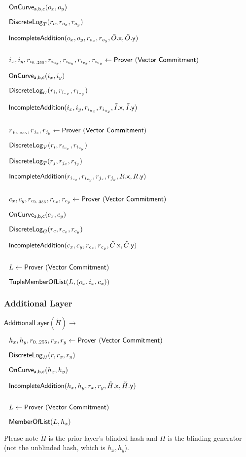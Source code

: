 \documentclass[]{article}
\begin{document}
$~~\mathsf{OnCurve_{a,b,c}}(o_x, o_y)$

$~~\mathsf{DiscreteLog}_T(r_o, r_{o_x}, r_{o_y})$

$~~\mathsf{IncompleteAddition}(o_x, o_y, r_{o_x}, r_{o_y}, \tilde{O}\mathsf{.x}, \tilde{O}\mathsf{.y})$

$ $

$~~i_x, i_y, r_{i_{0..255}}, r_{i_{u_x}}, r_{i_{u_y}}, r_{i_{v_x}}, r_{i_{v_y}}\leftarrow \mathsf{Prover ~(Vector ~Commitment)}$

$~~\mathsf{OnCurve_{a,b,c}}(i_x, i_y)$

$~~\mathsf{DiscreteLog}_U(r_i, r_{i_{u_x}}, r_{i_{u_y}})$

$~~\mathsf{IncompleteAddition}(i_x, i_y, r_{i_{u_x}}, r_{i_{u_y}}, \tilde{I}\mathsf{.x}, \tilde{I}\mathsf{.y})$

$ $

$~~r_{j_{0..255}}, r_{j_x}, r_{j_y}\leftarrow \mathsf{Prover ~(Vector ~Commitment)}$

$~~\mathsf{DiscreteLog}_V(r_i, r_{i_{v_x}}, r_{i_{v_y}})$

$~~\mathsf{DiscreteLog}_T(r_j, r_{j_x}, r_{j_y})$

$~~\mathsf{IncompleteAddition}(r_{i_{v_x}}, r_{i_{v_y}}, r_{j_x}, r_{j_y}, R\mathsf{.x}, R\mathsf{.y})$

$ $

$~~c_x, c_y, r_{c_{0..255}}, r_{c_x}, r_{c_y}\leftarrow \mathsf{Prover ~(Vector ~Commitment)}$

$~~\mathsf{OnCurve_{a,b,c}}(c_x, c_y)$

$~~\mathsf{DiscreteLog}_G(r_c, r_{c_x}, r_{c_y})$

$~~\mathsf{IncompleteAddition}(c_x, c_y, r_{c_x}, r_{c_y}, \tilde{C}\mathsf{.x}, \tilde{C}\mathsf{.y})$

$ $

$~~L\leftarrow \mathsf{Prover ~(Vector ~Commitment)}$

$~~\mathsf{TupleMemberOfList}(L, (o_x, i_x, c_x))$

\subsubsection{Additional Layer}

$\mathsf{AdditionalLayer}(\tilde{H}) \rightarrow$

$~~h_x, h_y, r_{0..255}, r_x, r_y\leftarrow \mathsf{Prover ~(Vector ~Commitment)}$

$~~\mathsf{DiscreteLog}_H(r, r_x, r_y)$

$~~\mathsf{OnCurve_{a,b,c}}(h_x, h_y)$

$~~\mathsf{IncompleteAddition}(h_x, h_y, r_x, r_y, \tilde{H}\mathsf{.x}, \tilde{H}\mathsf{.y})$

$ $

$~~L\leftarrow \mathsf{Prover ~(Vector ~Commitment)}$

$~~\mathsf{MemberOfList}(L, h_x)$

Please note $\tilde{H}$ is the prior layer's blinded hash and $H$ is the blinding generator (not the unblinded hash, which is $h_x, h_y$).
\end{document}
